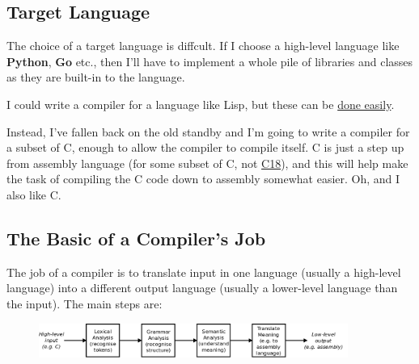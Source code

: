 \documentclass[a4paper,12pt]{article}
\begin{document}
\subsection{Target Language}

The choice of a target language is diffcult. If I choose a high-level language like \textbf{Python}, \textbf{Go} etc., then I'll have to implement a whole pile of libraries and classes as they are built-in to the language.

I could write a compiler for a language like Lisp, but these can be \href{ftp://publications.ai.mit.edu/ai-publications/pdf/AIM-039.pdf}{done easily}.

Instead, I've fallen back on the old standby and I'm going to write a compiler for a subset of C, enough to allow the compiler to compile itself. C is just a step up from assembly language (for some subset of C, not \href{https://en.wikipedia.org/wiki/C18_(C_standard_revision)}{C18}), and this will help make the task of compiling the C code down to assembly somewhat easier. Oh, and I also like C.

\subsection{The Basic of a Compiler's Job}

The job of a compiler is to translate input in one language (usually a high-level language) into a different output language (usually a lower-level language than the input). The main steps are:

\begin{figure}[!ht]
    \centering
    \includegraphics[width= 0.9\textwidth]{parsing_steps.png}
\end{figure}
\end{document}
